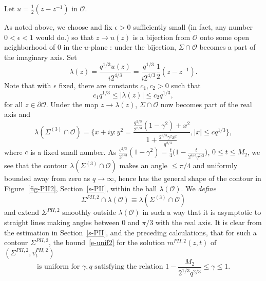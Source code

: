 \documentclass{amsart}
\theoremstyle{definition}
\theoremstyle{remark}
\numberwithin{equation}{section}
\begin{document}
Let $u=\frac12(z-z^{-1})$ in $\mathcal{O}$.
\begin{figure}[ht]
 \centerline{}
 \caption{}\label{fig-map}
\end{figure}
As noted above, we choose and fix $\epsilon>0$ sufficiently small 
(in fact, any number $0<\epsilon<1$ would do.) so that $z\to u(z)$ 
is a bijection 
from $\mathcal{O}$ onto some open neighborhood of $0$ in the $u$-plane : 
under the bijection, 
$\Sigma\cap\mathcal{O}$ becomes a part of
the imaginary axis.
Set $$\lambda(z)=\frac{q^{1/3}u(z)}{i2^{4/3}}=
\frac{q^{1/3}}{i2^{4/3}}\frac12(z-z^{-1}).$$
Note that with $\epsilon$ fixed, there are constants $c_1,c_2>0$ 
such that  
\begin{equation}\label{e-z13}
  c_1 q^{1/3}\le |\lambda(z)| \le c_2 q^{1/3},  
\end{equation}
for all $z\in\partial\mathcal{O}$.
Under the map $z\to\lambda(z)$, $\Sigma\cap\mathcal{O}$ now becomes 
part of the real axis  and 
\begin{equation}
   \lambda(\Sigma^{(3)}\cap\mathcal{O}) = \{ x+iy : 
y^2=\frac{\frac{q^{2/3}}{2^{8/3}}(1-\gamma^2)+x^2}
{1+\frac{2^{8/3}\gamma^2 x^2}{q^{2/3}}}, |x|\le cq^{1/3} \},
\end{equation}
where $c$ is a fixed small number.
As $\frac{q^{2/3}}{2^{8/3}}(1-\gamma^2)=\frac{t}4\bigl(
1-\frac{t}{2^{4/3}q^{2/3}} \bigr)$, $0\le t\le M_2$, we see that 
the contour $\lambda(\Sigma^{(3)}\cap\mathcal{O})$ makes an angle 
$\le \pi/4$ and uniformly bounded away from zero as $q\to\infty$, 
hence has the general shape of the contour in 
Figure~\ref{fig-PII2}, Section~\ref{s-PII}, 
within the ball $\lambda(\mathcal{O})$.
We \emph{define} 
\begin{equation}
   \Sigma^{PII,2}\cap\lambda(\mathcal{O}) \equiv 
\lambda(\Sigma^{(3)}\cap\mathcal{O})
\end{equation}
and extend $\Sigma^{PII,2}$ smoothly outside $\lambda(\mathcal{O})$ 
in such a way that it is asymptotic to straight lines making angles 
between 0 and $\pi/3$ with the real axis.
It is clear from the estimation in Section~\ref{s-PII}, and the 
preceding calculations, that for such a contour $\Sigma^{PII,2}$, 
the bound~\eqref{e-unif2} for the solution $m^{PII,2}(z,t)$ 
of $(\Sigma^{PII,2},v_t^{PII,2})$
\begin{equation}\label{e-z15}
   \text{is uniform for $\gamma, q$ satisfying the relation 
$1-\frac{M_2}{2^{1/3}q^{2/3}}\le \gamma\le 1$.}
\end{equation}
\end{document}
